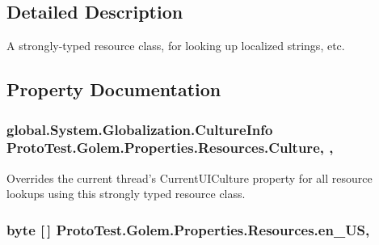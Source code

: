 \subsection{Detailed Description}
A strongly-\/typed resource class, for looking up localized strings, etc. 



\subsection{Property Documentation}
\hypertarget{class_proto_test_1_1_golem_1_1_properties_1_1_resources_ac4056390f5455ac9589883e5561ed640}{
\subsubsection[{Culture}]{\setlength{\rightskip}{0pt plus 5cm}global.\-System.\-Globalization.\-Culture\-Info Proto\-Test.\-Golem.\-Properties.\-Resources.\-Culture\hspace{0.3cm}{\ttfamily [static]}, {\ttfamily [get]}, {\ttfamily [set]}}}\label{class_proto_test_1_1_golem_1_1_properties_1_1_resources_ac4056390f5455ac9589883e5561ed640}


Overrides the current thread's Current\-U\-I\-Culture property for all resource lookups using this strongly typed resource class. 

\hypertarget{class_proto_test_1_1_golem_1_1_properties_1_1_resources_a01eeb504f28688500d6e942e0a02ec3d}{
\subsubsection[{en\-\_\-\-U\-S}]{\setlength{\rightskip}{0pt plus 5cm}byte \mbox{[}$\,$\mbox{]} Proto\-Test.\-Golem.\-Properties.\-Resources.\-en\-\_\-\-U\-S\hspace{0.3cm}{\ttfamily [static]}, {\ttfamily [get]}}}\label{class_proto_test_1_1_golem_1_1_properties_1_1_resources_a01eeb504f28688500d6e942e0a02ec3d}



